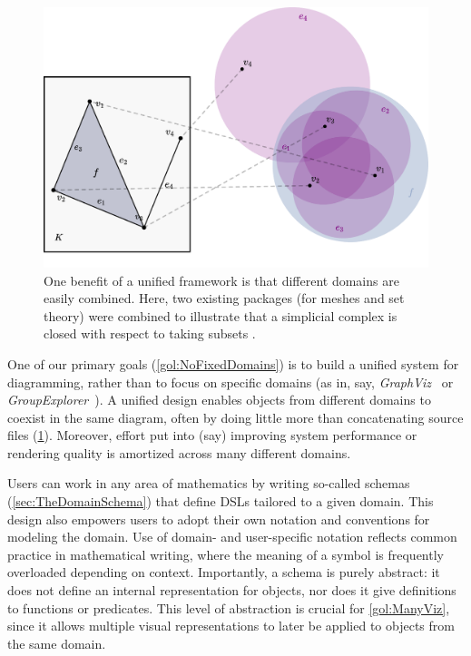 \begin{figure}
   \begin{minipage}[c]{.35\columnwidth}
      \vspace{5\baselineskip}\caption{One benefit of a unified framework is that different domains are easily combined.  Here, two existing packages (for meshes and set theory) were combined to illustrate that a simplicial complex  is closed with respect to taking subsets .\label{fig:DomainInterop}}
   \end{minipage}\hfill
   \begin{minipage}[c]{.55\columnwidth}
  \includegraphics[width=\textwidth]{assets/penrose/domain-interop.pdf}
   \end{minipage}\vspace{-\baselineskip}
\end{figure}

One of our primary goals (\ref{gol:NoFixedDomains}) is to build a unified system for diagramming, rather than to focus on specific domains (as in, say, \emph{GraphViz}~\cite{Graphviz} or \emph{GroupExplorer}~\cite{GroupExplorer}).  A unified design enables objects from different domains to coexist in the same diagram, often by doing little more than concatenating source files (\cref{fig:DomainInterop}).  Moreover, effort put into (say) improving system performance or rendering quality is amortized across many different domains.

Users can work in any area of mathematics by writing so-called \Domain{} schemas (\cref{sec:TheDomainSchema}) that define DSLs tailored to a given domain.  This design also empowers users to adopt their own notation and conventions for modeling the domain.  Use of domain- and user-specific notation reflects common practice in mathematical writing, where the meaning of a symbol is frequently overloaded depending on context.  Importantly, a \Domain{} schema is purely abstract: it does not define an internal representation for objects, nor does it give definitions to functions or predicates.  This level of abstraction is crucial for \ref{gol:ManyViz}, since it allows multiple visual representations to later be applied to objects from the same domain.

